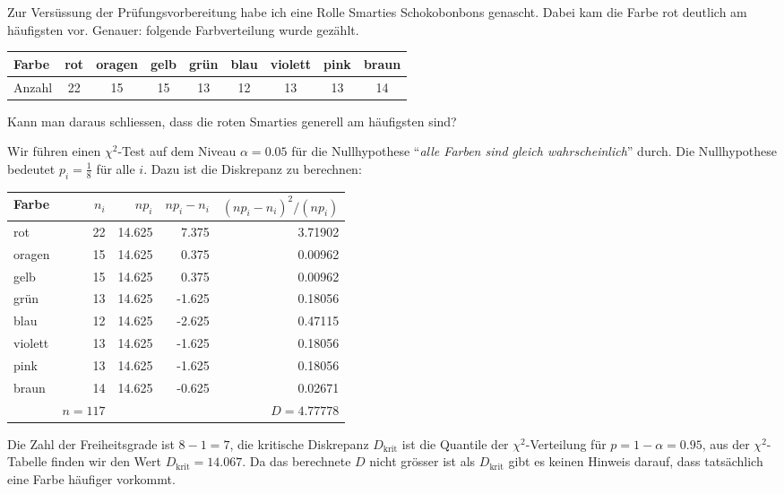 Zur Versüssung der Prüfungsvorbereitung habe ich eine Rolle Smarties
Schokobonbons genascht. Dabei kam die Farbe rot deutlich am häufigsten vor.
Genauer: folgende Farbverteilung wurde gezählt. 
\begin{center}
\begin{tabular}{|l|cccccccc|}
\hline
Farbe&rot&oragen&gelb&grün&blau&violett&pink&braun\\
\hline
Anzahl&22&    15&  15&   13&  12&     13&  13&   14\\
\hline
\end{tabular}
\end{center}
Kann man daraus schliessen, dass die roten Smarties generell am häufigsten
sind?


\begin{loesung}
Wir führen einen $\chi^2$-Test auf dem Niveau $\alpha=0.05$
für die Nullhypothese 
``{\it alle Farben sind gleich wahrscheinlich}'' durch.
Die Nullhypothese bedeutet $p_i=\frac18$ für alle $i$.
Dazu ist die Diskrepanz zu berechnen:
\begin{center}
\begin{tabular}{|l|r|r|r|r|}
\hline
Farbe  &$n_i$   &$np_i$&$np_i-n_i$&$(np_i-n_i)^2/(np_i)$\\
\hline
rot    &   22   &14.625&     7.375&              3.71902\\
oragen &   15   &14.625&     0.375&              0.00962\\
gelb   &   15   &14.625&     0.375&              0.00962\\
grün  &   13   &14.625&    -1.625&              0.18056\\
blau   &   12   &14.625&    -2.625&              0.47115\\
violett&   13   &14.625&    -1.625&              0.18056\\
pink   &   13   &14.625&    -1.625&              0.18056\\
braun  &   14   &14.625&    -0.625&              0.02671\\
\hline
       &$n=117$ &      &          &$D= 4.77778         $\\
\hline
\end{tabular}
\end{center}
Die Zahl der Freiheitsgrade ist $8-1=7$, die kritische Diskrepanz
$D_{\text{krit}}$ ist die Quantile der $\chi^2$-Verteilung 
für $p=1-\alpha=0.95$, aus der $\chi^2$-Tabelle finden wir den
Wert $D_{\text{krit}}=14.067$. Da das berechnete $D$ nicht grösser
ist als $D_{\text{krit}}$ gibt es keinen Hinweis darauf, dass
tatsächlich eine Farbe häufiger vorkommt.
\end{loesung}
